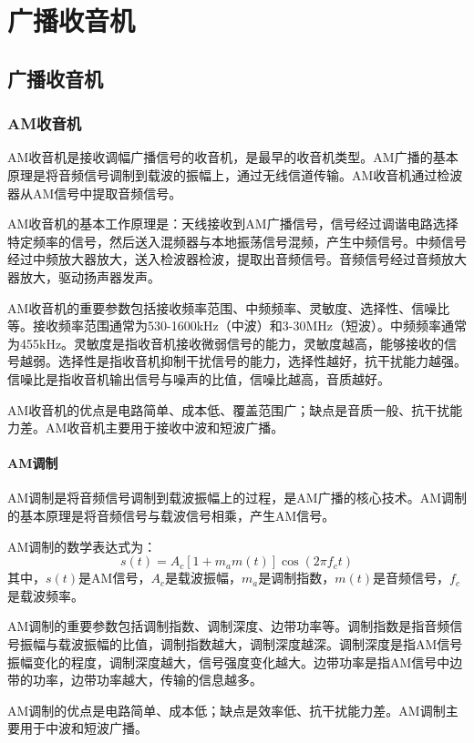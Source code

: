\documentclass[12pt,UTF8]{ctexbook}
\begin{document}
\part{广播收音机}

\chapter{广播收音机}

\section{AM收音机}

AM收音机是接收调幅广播信号的收音机，是最早的收音机类型。AM广播的基本原理是将音频信号调制到载波的振幅上，通过无线信道传输。AM收音机通过检波器从AM信号中提取音频信号。

AM收音机的基本工作原理是：天线接收到AM广播信号，信号经过调谐电路选择特定频率的信号，然后送入混频器与本地振荡信号混频，产生中频信号。中频信号经过中频放大器放大，送入检波器检波，提取出音频信号。音频信号经过音频放大器放大，驱动扬声器发声。

AM收音机的重要参数包括接收频率范围、中频频率、灵敏度、选择性、信噪比等。接收频率范围通常为530-1600kHz（中波）和3-30MHz（短波）。中频频率通常为455kHz。灵敏度是指收音机接收微弱信号的能力，灵敏度越高，能够接收的信号越弱。选择性是指收音机抑制干扰信号的能力，选择性越好，抗干扰能力越强。信噪比是指收音机输出信号与噪声的比值，信噪比越高，音质越好。

AM收音机的优点是电路简单、成本低、覆盖范围广；缺点是音质一般、抗干扰能力差。AM收音机主要用于接收中波和短波广播。

\subsection{AM调制}

AM调制是将音频信号调制到载波振幅上的过程，是AM广播的核心技术。AM调制的基本原理是将音频信号与载波信号相乘，产生AM信号。

AM调制的数学表达式为：
\[ s(t) = A_c[1 + m_a m(t)]\cos(2\pi f_c t) \]
其中，$s(t)$是AM信号，$A_c$是载波振幅，$m_a$是调制指数，$m(t)$是音频信号，$f_c$是载波频率。

AM调制的重要参数包括调制指数、调制深度、边带功率等。调制指数是指音频信号振幅与载波振幅的比值，调制指数越大，调制深度越深。调制深度是指AM信号振幅变化的程度，调制深度越大，信号强度变化越大。边带功率是指AM信号中边带的功率，边带功率越大，传输的信息越多。

AM调制的优点是电路简单、成本低；缺点是效率低、抗干扰能力差。AM调制主要用于中波和短波广播。
\end{document}
